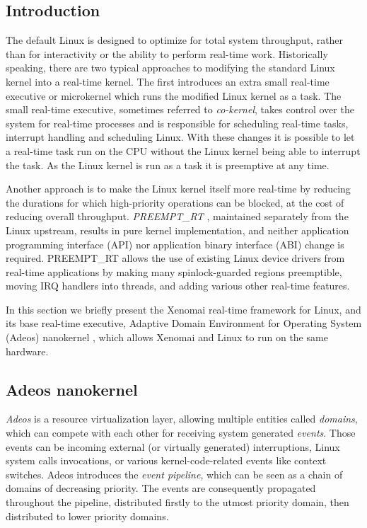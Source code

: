 \documentclass[10pt,a4paper]{article}
\begin{document}
\begin{multicols}{2}

\section{Introduction}
The default Linux is designed to optimize for total system throughput, rather than for interactivity or the ability to perform real-time work. Historically speaking, there are two typical approaches to modifying the standard Linux kernel into a real-time kernel. The first introduces an extra small real-time executive \cite{rtai} or microkernel \cite{sel4} which runs the modified Linux kernel as a task. The small real-time executive, sometimes referred to \textit{co-kernel}, takes control over the system for real-time processes and is responsible for scheduling real-time tasks, interrupt handling and scheduling Linux. With these changes it is possible to let a real-time task run on the CPU without the Linux kernel being able to interrupt the task. As the Linux kernel is run as a task it is preemptive at any time.

Another approach is to make the Linux kernel itself more real-time by reducing the durations for which high-priority operations can be blocked, at the cost of reducing overall throughput. \textit{PREEMPT\_RT} \cite{linux-rt}, maintained separately from the Linux upstream, results in pure kernel implementation, and neither application programming interface (API) nor application binary interface (ABI) change is required. PREEMPT\_RT allows the use of existing Linux device drivers from real-time applications by making many spinlock-guarded regions preemptible, moving IRQ handlers into threads, and adding various other real-time features.

In this section we briefly present the Xenomai \cite{xenomai} real-time framework for Linux, and its base real-time executive, Adaptive Domain Environment for Operating System (Adeos) nanokernel \cite{adeos}, which allows Xenomai and Linux to run on the same hardware.

\subsection{Adeos nanokernel}

\textit{Adeos} is a resource virtualization layer, allowing multiple entities called \textit{domains}, which can compete with each other for receiving system generated \textit{events}. Those events can be incoming external (or virtually generated) interruptions, Linux system calls invocations, or various kernel-code-related events like context switches. Adeos introduces the \textit{event pipeline}, which can be seen as a chain of domains of decreasing priority. The events are consequently propagated throughout the pipeline, distributed firstly to the utmost priority domain, then distributed to lower priority domains.


\end{multicols}
\end{document}
